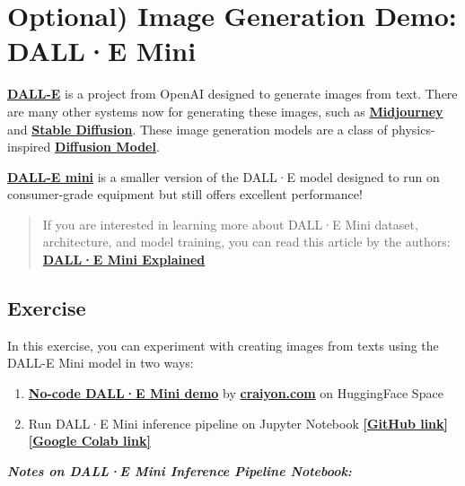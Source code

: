 \section{Optional) Image Generation Demo: DALL·E Mini}

\href{https://openai.com/research/dall-e}{\textbf{DALL-E}} is a project from OpenAI designed to generate images from text. There are many other systems now for generating these images, such as \href{https://www.midjourney.com/}{\textbf{Midjourney}} and \href{https://huggingface.co/spaces/stabilityai/stable-diffusion}{\textbf{Stable Diffusion}}. These image generation models are a class of physics-inspired \href{https://en.wikipedia.org/wiki/Diffusion_model}{\textbf{Diffusion Model}}.

\href{https://github.com/borisdayma/dalle-mini}{\textbf{DALL-E mini}} is a smaller version of the DALL·E model designed to run on consumer-grade equipment but still offers excellent performance!

\begin{quote}
If you are interested in learning more about DALL·E Mini dataset, architecture, and model training, you can read this article by the authors: \href{https://wandb.ai/dalle-mini/dalle-mini/reports/DALL-E-mini--Vmlldzo4NjIxODA}{\textbf{DALL·E Mini Explained}}

\end{quote}

\subsection{Exercise}

In this exercise, you can experiment with creating images from texts using the DALL-E Mini model in two ways:

\begin{enumerate}
    \item \href{https://huggingface.co/spaces/dalle-mini/dalle-mini}{\textbf{No-code DALL·E Mini demo}} by \href{https://www.craiyon.com/}{\textbf{craiyon.com}} on HuggingFace Space
    \item Run DALL·E Mini inference pipeline on Jupyter Notebook \href{https://github.com/borisdayma/dalle-mini/blob/main/tools/inference/inference_pipeline.ipynb}{\textbf{[GitHub link]}} \href{https://colab.research.google.com/github/borisdayma/dalle-mini/blob/main/tools/inference/inference_pipeline.ipynb}{\textbf{[Google Colab link]}}
\end{enumerate}

\textit{\textbf{Notes on DALL·E Mini Inference Pipeline Notebook:}}


